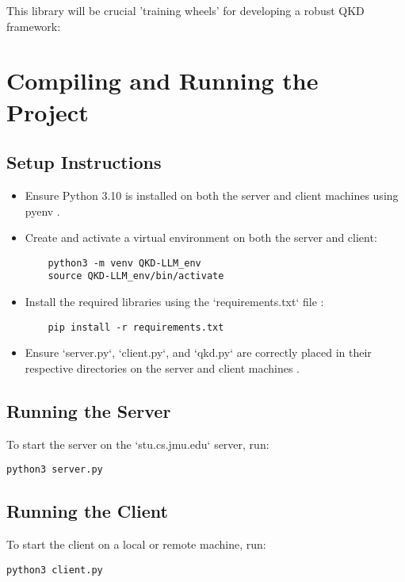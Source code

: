 \documentclass{article}
\begin{document}
This library will be crucial 'training wheels' for developing a robust QKD framework:






\section{Compiling and Running the Project}

\subsection{Setup Instructions}
\begin{itemize}
    \item Ensure Python 3.10 is installed on both the server and client machines using pyenv \parencite{nielsen2010}.
    \item Create and activate a virtual environment on both the server and client:
    \begin{verbatim}
    python3 -m venv QKD-LLM_env
    source QKD-LLM_env/bin/activate
    \end{verbatim}
    \item Install the required libraries using the `requirements.txt` file \parencite{tanenbaum2020}:
    \begin{verbatim}
    pip install -r requirements.txt
    \end{verbatim}
    \item Ensure `server.py`, `client.py`, and `qkd.py` are correctly placed in their respective directories on the server and client machines \parencite{lo2012}.
\end{itemize}

\subsection{Running the Server}
To start the server on the `stu.cs.jmu.edu` server, run:
\begin{verbatim}
python3 server.py
\end{verbatim}

\subsection{Running the Client}
To start the client on a local or remote machine, run:
\begin{verbatim}
python3 client.py
\end{verbatim}
\end{document}
